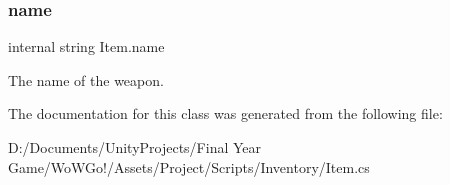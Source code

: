 \mbox{\label{class_item_a4f06d4968b81d435f946898640e51e03}} 
\subsubsection{\texorpdfstring{name}{name}}
{\footnotesize\ttfamily internal string Item.\+name\hspace{0.3cm}{\ttfamily [private]}}



The name of the weapon. 



The documentation for this class was generated from the following file\+:\begin{DoxyCompactItemize}
\item 
D\+:/\+Documents/\+Unity\+Projects/\+Final Year Game/\+Wo\+W\+Go!/\+Assets/\+Project/\+Scripts/\+Inventory/Item.\+cs\end{DoxyCompactItemize}
